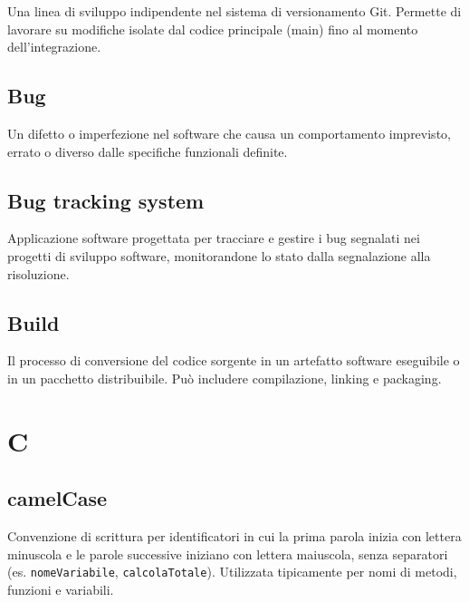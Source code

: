 \documentclass[a4paper, 11pt, oneside]{scrartcl} %
\begin{document}

Una linea di sviluppo indipendente nel sistema di versionamento Git. Permette di lavorare su modifiche isolate dal codice principale (main) fino al momento dell'integrazione.

\vspace{0.5cm}

\subsection*{Bug}
Un difetto o imperfezione nel software che causa un comportamento imprevisto, errato o diverso dalle specifiche funzionali definite.
\vspace{0.5cm}

\subsection*{Bug tracking system}
Applicazione software progettata per tracciare e gestire i bug segnalati nei progetti di sviluppo software, monitorandone lo stato dalla segnalazione alla risoluzione.
\vspace{0.5cm}

\subsection*{Build}
Il processo di conversione del codice sorgente in un artefatto software eseguibile o in un pacchetto distribuibile. Può includere compilazione, linking e packaging.
\vspace{0.5cm}


\section*{C}


\subsection*{camelCase}
Convenzione di scrittura per identificatori in cui la prima parola inizia con lettera minuscola e le parole successive iniziano con lettera maiuscola, senza separatori (es. \texttt{nomeVariabile}, \texttt{calcolaTotale}). Utilizzata tipicamente per nomi di metodi, funzioni e variabili.
\vspace{0.5cm}
\end{document}
